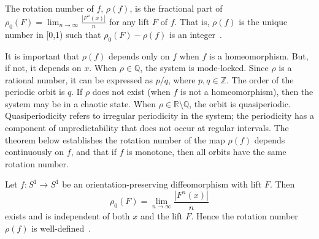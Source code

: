 \begin{singlespacing}
\begin{definition}\label{rho}
The rotation number of $f$, $\rho(f)$, is the fractional part of
$\rho_0(F) = \lim_{n \to \infty} \frac{|F^n(x)|}{n}$ for any lift $F$ of $f$. That is, $\rho(f)$ is the unique
number in [0,1) such that $\rho_0(F)-\rho(f)$ is an integer~\cite{devaney}.
\end{definition}
\end{singlespacing}

\noindent It is important that $\rho(f)$ depends only on $f$ when $f$
is a homeomorphism. But, if not, it depends on $x$. When $\rho \in \mathbb{Q}$, the system is mode-locked. Since
$\rho$ is a rational number, it can be expressed as $p/q$, where $p,q
\in \mathbb{Z}$. The order of the periodic orbit is $q$. If $\rho$
does not exist (when $f$ is not a homeomorphism), then the system may be in a chaotic
state. When $\rho \in \mathbb{R} \setminus \mathbb{Q}$, the orbit is
quasiperiodic. Quasiperiodicity refers to irregular periodicity in the
system; the periodicity has a component of unpredictability that does
not occur at regular intervals. The theorem below
establishes the rotation number of the map $\rho(f)$
depends continuously on $f$, and that if $f$ is monotone, then all
orbits have the same rotation number.

\begin{singlespacing}
\begin{theorem}
Let $f:S^1 \to S^1$ be an orientation-preserving diffeomorphism with
lift $F$. Then
\begin{equation*}
\rho_0(F) = \lim_{n \to \infty} \frac{|F^n(x)|}{n}
\end{equation*}
exists and is independent of both $x$ and the lift $F$. Hence the
rotation number $\rho(f)$ is well-defined~\cite{devaney}.
\end{theorem}
\end{singlespacing}

